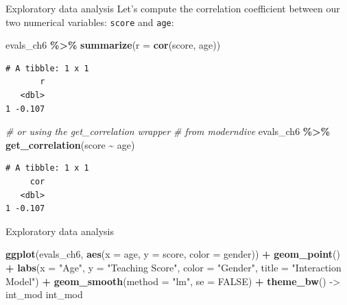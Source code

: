 \documentclass[
  ignorenonframetext,
]{beamer}
\newenvironment{Shaded}{\begin{snugshade}}{\end{snugshade}}
\newcommand{\AttributeTok}[1]{\textcolor[rgb]{0.13,0.29,0.53}{#1}}
\newcommand{\CommentTok}[1]{\textcolor[rgb]{0.56,0.35,0.01}{\textit{#1}}}
\newcommand{\ConstantTok}[1]{\textcolor[rgb]{0.56,0.35,0.01}{#1}}
\newcommand{\FunctionTok}[1]{\textcolor[rgb]{0.13,0.29,0.53}{\textbf{#1}}}
\newcommand{\NormalTok}[1]{#1}
\newcommand{\OtherTok}[1]{\textcolor[rgb]{0.56,0.35,0.01}{#1}}
\newcommand{\SpecialCharTok}[1]{\textcolor[rgb]{0.81,0.36,0.00}{\textbf{#1}}}
\newcommand{\StringTok}[1]{\textcolor[rgb]{0.31,0.60,0.02}{#1}}
\begin{document}
\begin{frame}[fragile]{Exploratory data analysis}
\protect\hypertarget{exploratory-data-analysis-11}{}
Let's compute the correlation coefficient between our two numerical
variables: \texttt{score} and \texttt{age}:

\small

\begin{Shaded}
\begin{Highlighting}[]
\NormalTok{evals\_ch6 }\SpecialCharTok{\%\textgreater{}\%} 
  \FunctionTok{summarize}\NormalTok{(}\AttributeTok{r =} \FunctionTok{cor}\NormalTok{(score, age))}
\end{Highlighting}
\end{Shaded}

\begin{verbatim}
# A tibble: 1 x 1
       r
   <dbl>
1 -0.107
\end{verbatim}

\begin{Shaded}
\begin{Highlighting}[]
\CommentTok{\# or using the get\_correlation wrapper}
\CommentTok{\# from moderndive}
\NormalTok{evals\_ch6 }\SpecialCharTok{\%\textgreater{}\%} 
  \FunctionTok{get\_correlation}\NormalTok{(score }\SpecialCharTok{\textasciitilde{}}\NormalTok{ age)}
\end{Highlighting}
\end{Shaded}

\begin{verbatim}
# A tibble: 1 x 1
     cor
   <dbl>
1 -0.107
\end{verbatim}

\normalsize
\end{frame}

\begin{frame}[fragile]{Exploratory data analysis}
\protect\hypertarget{exploratory-data-analysis-12}{}
\normalsize

\begin{Shaded}
\begin{Highlighting}[]
\FunctionTok{ggplot}\NormalTok{(evals\_ch6, }\FunctionTok{aes}\NormalTok{(}\AttributeTok{x =}\NormalTok{ age, }\AttributeTok{y =}\NormalTok{ score, }\AttributeTok{color =}\NormalTok{ gender)) }\SpecialCharTok{+}
  \FunctionTok{geom\_point}\NormalTok{() }\SpecialCharTok{+}
  \FunctionTok{labs}\NormalTok{(}\AttributeTok{x =} \StringTok{"Age"}\NormalTok{, }\AttributeTok{y =} \StringTok{"Teaching Score"}\NormalTok{, }\AttributeTok{color =} \StringTok{"Gender"}\NormalTok{,}
       \AttributeTok{title =} \StringTok{"Interaction Model"}\NormalTok{) }\SpecialCharTok{+}
  \FunctionTok{geom\_smooth}\NormalTok{(}\AttributeTok{method =} \StringTok{"lm"}\NormalTok{, }\AttributeTok{se =} \ConstantTok{FALSE}\NormalTok{) }\SpecialCharTok{+} 
  \FunctionTok{theme\_bw}\NormalTok{() }\OtherTok{{-}\textgreater{}}\NormalTok{ int\_mod}
\NormalTok{int\_mod}
\end{Highlighting}
\end{Shaded}

\normalsize
\end{frame}
\end{document}
